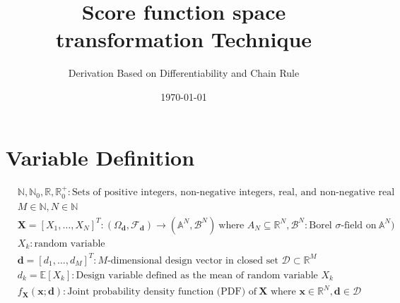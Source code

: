 \documentclass[12pt,a4paper, fleqn]{article}
\title{Score function space transformation Technique}
\author{Derivation Based on Differentiability and Chain Rule}
\date{\today}
\begin{document}
\maketitle
\tableofcontents
\newpage

\section{Variable Definition}
\vspace{12pt}
$
\begin{aligned}
    &\mathbb{N}, \mathbb{N}_0, \mathbb{R}, \mathbb{R}_0^+: \text{Sets of positive integers, non-negative integers, real, and non-negative real numbers} \\
    &M\in\mathbb{N}, N\in\mathbb{N}\\
    &\mathbf{X} = [X_1, \dots, X_N]^T: (\Omega_\mathbf{d},\mathcal{F}_\mathbf{d})\rightarrow (\mathbb{A}^N,\mathcal{B}^N)\: \text{where }A_N \subseteq \mathbb{R}^N, \mathcal{B}^N:\text{Borel $\sigma$-field on}\:\mathbb{A}^N) \\
    &X_k: \text{random variable}\\
    &\mathbf{d} = [d_1, \dots, d_M]^T: \text{$M$-dimensional design vector in closed set $\mathcal{D} \subset \mathbb{R}^M$} \\
    &d_k = \mathbb{E}[X_k]: \text{Design variable defined as the mean of random variable $X_k$} \\
    &f_{\mathbf{X}}(\mathbf{x}; \mathbf{d}): \text{Joint probability density function (PDF) of}\:\mathbf{X}\text{ where }\mathbf{x}\in\mathbb{R}^N,\mathbf{d}\in \mathcal{D}\\
\end{aligned}
$

\newpage
\end{document}
